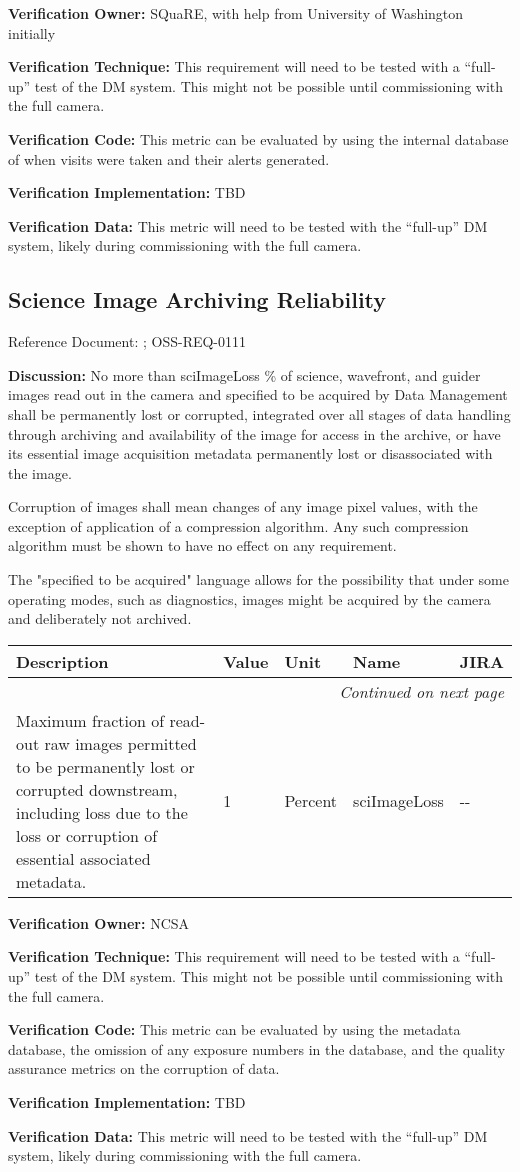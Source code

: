 \documentclass[DM,lsstdraft,toc]{lsstdoc}
\makeatletter
\newenvironment{metric}[0]{%
\setlength\LTleft{0pt}
\setlength\LTright{\fill}
\begin{longtable}[]{@{}p{0.4\textwidth}lp{0.75in}p{1.3in}p{0.75in}@{}}

\hline \textbf{Description} & \textbf{Value} & \textbf{Unit} & \textbf{Name} & \textbf{JIRA} \\ \hline
\endhead

\hline \multicolumn{5}{r}{\emph{Continued on next page}} \\
\endfoot

\hline\hline
\endlastfoot
}{%
\hline
\end{longtable}
}
\makeatother
\begin{document}
\textbf{Verification Owner:} SQuaRE, with help from University of
Washington initially

\textbf{Verification Technique:} This requirement will need to be tested
with a ``full-up'' test of the DM system. This might not be possible
until commissioning with the full camera.

\textbf{Verification Code:} This metric can be evaluated by using the
internal database of when visits were taken and their alerts generated.

\textbf{Verification Implementation:} TBD

\textbf{Verification Data:} This metric will need to be tested with the
``full-up'' DM system, likely during commissioning with the full camera.

\subsection{Science Image Archiving
Reliability}\label{science-image-archiving-reliability}

Reference Document: ; OSS-REQ-0111

\textbf{Discussion:} No more than sciImageLoss \% of science, wavefront,
and guider images read out in the camera and specified to be acquired by
Data Management shall be permanently lost or corrupted, integrated over
all stages of data handling through archiving and availability of the
image for access in the archive, or have its essential image acquisition
metadata permanently lost or disassociated with the image.

Corruption of images shall mean changes of any image pixel values, with
the exception of application of a compression algorithm. Any such
compression algorithm must be shown to have no effect on any \SRD
requirement.

The "specified to be acquired" language allows for the possibility that
under some operating modes, such as diagnostics, images might be
acquired by the camera and deliberately not archived.

\begin{metric}
Maximum fraction of read-out raw images permitted to be permanently lost
or corrupted downstream, including loss due to the loss or corruption of
essential associated metadata. & 1 & Percent & sciImageLoss &
-\/-\tabularnewline
\end{metric}

\textbf{Verification Owner:} NCSA

\textbf{Verification Technique:} This requirement will need to be tested
with a ``full-up'' test of the DM system. This might not be possible
until commissioning with the full camera.

\textbf{Verification Code:} This metric can be evaluated by using the
metadata database, the omission of any exposure numbers in the database,
and the quality assurance metrics on the corruption of data.

\textbf{Verification Implementation:} TBD

\textbf{Verification Data:} This metric will need to be tested with the
``full-up'' DM system, likely during commissioning with the full camera.


\end{document}
